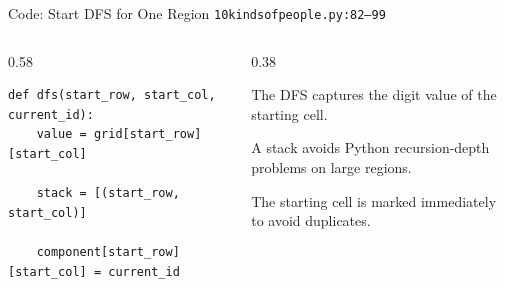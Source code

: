 \documentclass[aspectratio=169,11pt]{beamer}
\begin{document}
\begin{frame}[fragile]{Code: Start DFS for One Region}
\scriptsize
{} \texttt{10kindsofpeople.py:82--99}

\vspace{0.08cm}
\begin{columns}[T,totalwidth=\textwidth]
\begin{column}{0.58\textwidth}
\begin{lstlisting}[style=cpcode]
def dfs(start_row, start_col, current_id):
    value = grid[start_row][start_col]

    stack = [(start_row, start_col)]

    component[start_row][start_col] = current_id
\end{lstlisting}
\end{column}
\begin{column}{0.38\textwidth}
\begin{tightitemize}
  \item The DFS captures the digit value of the starting cell.
  \item A stack avoids Python recursion-depth problems on large regions.
  \item The starting cell is marked immediately to avoid duplicates.
\end{tightitemize}
\end{column}
\end{columns}
\end{frame}
\end{document}
